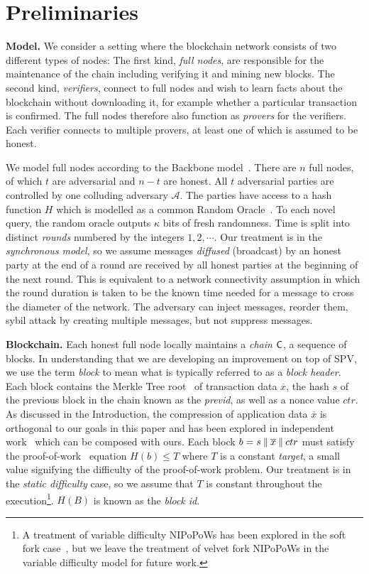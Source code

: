 \section{Preliminaries}\label{sec:preliminaries}

\noindent
\textbf{Model.}
We consider a setting where the blockchain network consists of two different
types of nodes: The first kind, \emph{full nodes}, are responsible for the
maintenance of the chain including verifying it and mining new blocks. The
second kind, \emph{verifiers}, connect to full nodes and wish to learn facts
about the blockchain without downloading it, for example whether a particular
transaction is confirmed. The full nodes therefore also function as
\emph{provers} for the verifiers. Each verifier connects to multiple provers, at
least one of which is assumed to be honest.

We model full nodes according to the Backbone model~\cite{backbone}. There are
$n$ full nodes, of which $t$ are adversarial and $n - t$ are honest. All $t$
adversarial parties are controlled by one colluding adversary $\mathcal{A}$. The
parties have access to a hash function $H$ which is modelled as a common Random
Oracle~\cite{ro}. To each novel query, the random oracle outputs $\kappa$ bits
of fresh randomness. Time is split into distinct \emph{rounds} numbered by the
integers $1, 2, \cdots$. Our treatment is in the \emph{synchronous model}, so we
assume messages \emph{diffused} (broadcast) by an honest party at the end of a
round are received by all honest parties at the beginning of the next round.
This is equivalent to a network connectivity assumption in which the round
duration is taken to be the known time needed for a message to cross the
diameter of the network. The adversary can inject messages, reorder them, sybil
attack by creating multiple messages, but not suppress messages.

\noindent
\textbf{Blockchain.} Each honest full node locally maintains a \emph{chain} $\mathsf{C}$, a sequence of
blocks. In understanding that we are developing an improvement on top of SPV, we
use the term \emph{block} to mean what is typically referred to as a
\emph{block header}. Each block contains the Merkle Tree root~\cite{merkle} of
transaction data $\overline{x}$, the hash $s$ of the previous block in the chain
known as the \emph{previd}, as well as a nonce value $ctr$. As discussed in the
Introduction, the compression of application data $\overline{x}$ is orthogonal
to our goals in this paper and has been explored in independent
work~\cite{edrax} which can be composed with ours. Each block $b = s \mathbin{\|}
\overline{x} \mathbin{\|} ctr$ must satisfy the proof-of-work~\cite{pow} equation $H(b) \leq T$
where $T$ is a constant \emph{target}, a small value signifying the difficulty
of the proof-of-work problem. Our treatment is in the \emph{static difficulty}
case, so we assume that $T$ is constant throughout the execution\footnote{A
treatment of variable difficulty NIPoPoWs has been explored in the soft fork
case~\cite{dionyziz}, but we leave the treatment of velvet fork NIPoPoWs in the
variable difficulty model for future work.}. $H(B)$ is
known as the \emph{block id}.

